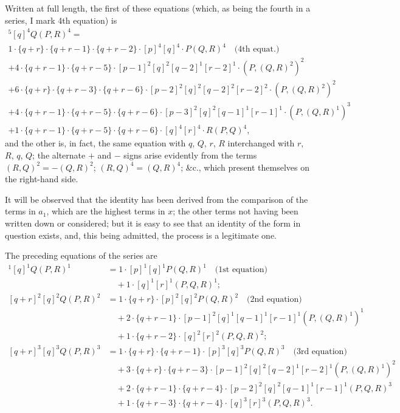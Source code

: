 \documentclass[11pt,a4paper]{book}
\begin{document}
Written at full length, the first of these equations (which, as being the fourth in a series, I mark 4th equation) is
\begin{multline*}
[q + r]^5 [q]^4 Q(P, R)^4 = \\
1 \cdot \{q + r\} \cdot \{q + r - 1\} \cdot \{q + r - 2\} \cdot [p]^4 [q]^4 \cdot P(Q, R)^4 \quad \text{(4th equat.)} \\
+ 4 \cdot \{q + r - 1\} \cdot \{q + r - 5\} \cdot [p - 1]^2 [q]^2 [q - 2]^1 [r - 2]^1 \cdot (P, (Q, R)^2)^2 \\
+ 6 \cdot \{q + r\} \cdot \{q + r - 3\} \cdot \{q + r - 6\} \cdot [p - 2]^2 [q]^2 [q - 2]^2 [r - 2]^2 \cdot (P, (Q, R)^2)^2 \\
+ 4 \cdot \{q + r - 1\} \cdot \{q + r - 5\} \cdot \{q + r - 6\} \cdot [p - 3]^2 [q]^2 [q - 1]^1 [r - 1]^1 \cdot (P, (Q, R)^1)^3 \\
+ 1 \cdot \{q + r - 1\} \cdot \{q + r - 5\} \cdot \{q + r - 6\} \cdot [q]^4 [r]^4 \cdot R(P, Q)^4,
\end{multline*}
and the other is, in fact, the same equation with $q$, $Q$, $r$, $R$ interchanged with $r$, $R$, $q$, $Q$; the alternate $+$ and $-$ signs arise evidently from the terms $(R, Q)^2 = -(Q, R)^2$; $(R, Q)^4 = (Q, R)^4$; \&c., which present themselves on the right-hand side.

It will be observed that the identity has been derived from the comparison of the terms in $a_1$, which are the highest terms in $x$; the other terms not having been written down or considered; but it is easy to see that an identity of the form in question exists, and, this being admitted, the process is a legitimate one.

The preceding equations of the series are
\begin{align*}
[q + r]^1 [q]^1 Q(P, R)^1 &= 1 \cdot [p]^1 [q]^1 P(Q, R)^1 \quad \text{(1st equation)} \\
&\quad + 1 \cdot [q]^1 [r]^1 (P, Q, R)^1; \\
[q + r]^2 [q]^2 Q(P, R)^2 &= 1 \cdot \{q + r\} \cdot [p]^2 [q]^2 P(Q, R)^2 \quad \text{(2nd equation)} \\
&\quad + 2 \cdot \{q + r - 1\} \cdot [p - 1]^2 [q]^1 [q - 1]^1 [r - 1]^1 (P, (Q, R)^1)^1 \\
&\quad + 1 \cdot \{q + r - 2\} \cdot [q]^2 [r]^2 (P, Q, R)^2; \\
[q + r]^3 [q]^3 Q(P, R)^3 &= 1 \cdot \{q + r\} \cdot \{q + r - 1\} \cdot [p]^3 [q]^3 P(Q, R)^3 \quad \text{(3rd equation)} \\
&\quad + 3 \cdot \{q + r\} \cdot \{q + r - 3\} \cdot [p - 1]^2 [q]^2 [q - 2]^1 [r - 2]^1 (P, (Q, R)^1)^2 \\
&\quad + 2 \cdot \{q + r - 1\} \cdot \{q + r - 4\} \cdot [p - 2]^2 [q]^2 [q - 1]^1 [r - 1]^1 (P, Q, R)^3 \\
&\quad + 1 \cdot \{q + r - 3\} \cdot \{q + r - 4\} \cdot [q]^3 [r]^3 (P, Q, R)^3.
\end{align*}
\end{document}
